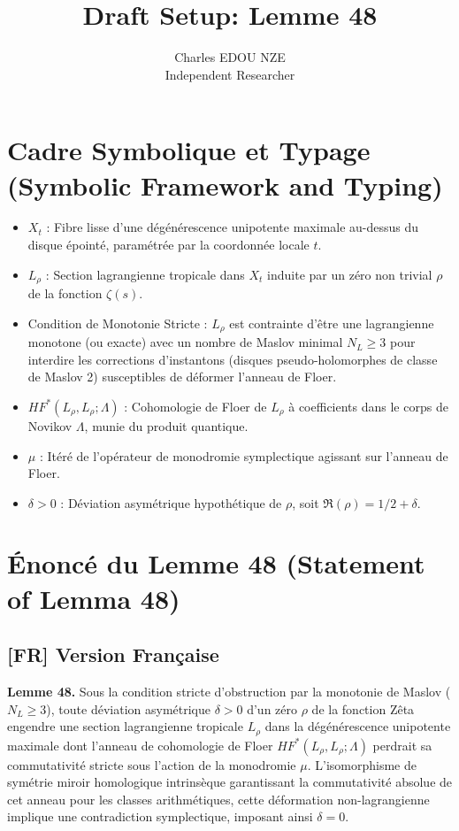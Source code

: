 \documentclass{article}
\author{Charles EDOU NZE \\ \small Independent Researcher}
\title{Draft Setup: Lemme 48}
\begin{document}
\maketitle

\section*{Cadre Symbolique et Typage (Symbolic Framework and Typing)}

\begin{itemize}
    \item $X_t$ : Fibre lisse d'une dégénérescence unipotente maximale au-dessus du disque épointé, paramétrée par la coordonnée locale $t$.
    \item $L_\rho$ : Section lagrangienne tropicale dans $X_t$ induite par un zéro non trivial $\rho$ de la fonction $\zeta(s)$.
    \item Condition de Monotonie Stricte : $L_\rho$ est contrainte d'être une lagrangienne monotone (ou exacte) avec un nombre de Maslov minimal $N_L \ge 3$ pour interdire les corrections d'instantons (disques pseudo-holomorphes de classe de Maslov 2) susceptibles de déformer l'anneau de Floer.
    \item $HF^*(L_\rho, L_\rho; \Lambda)$ : Cohomologie de Floer de $L_\rho$ à coefficients dans le corps de Novikov $\Lambda$, munie du produit quantique.
    \item $\mu$ : Itéré de l'opérateur de monodromie symplectique agissant sur l'anneau de Floer.
    \item $\delta > 0$ : Déviation asymétrique hypothétique de $\rho$, soit $\Re(\rho) = 1/2 + \delta$.
\end{itemize}

\section*{Énoncé du Lemme 48 (Statement of Lemma 48)}

\subsection*{[FR] Version Française}
\textbf{Lemme 48.} Sous la condition stricte d'obstruction par la monotonie de Maslov ($N_L \ge 3$), toute déviation asymétrique $\delta > 0$ d'un zéro $\rho$ de la fonction Zêta engendre une section lagrangienne tropicale $L_\rho$ dans la dégénérescence unipotente maximale dont l'anneau de cohomologie de Floer $HF^*(L_\rho, L_\rho; \Lambda)$ perdrait sa commutativité stricte sous l'action de la monodromie $\mu$. L'isomorphisme de symétrie miroir homologique intrinsèque garantissant la commutativité absolue de cet anneau pour les classes arithmétiques, cette déformation non-lagrangienne implique une contradiction symplectique, imposant ainsi $\delta = 0$.
\end{document}
